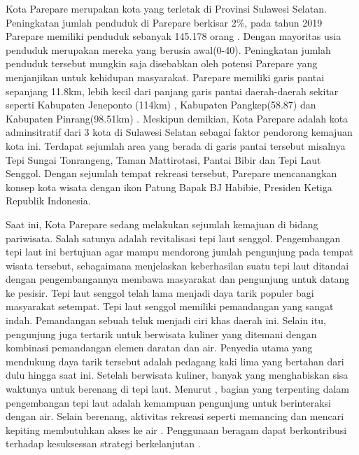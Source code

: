 \documentclass[../projects/thesis.tex]{subfiles}
\begin{document}
Kota Parepare merupakan kota yang terletak di Provinsi Sulawesi Selatan. Peningkatan jumlah penduduk di Parepare berkisar 2\%, pada tahun 2019 Parepare memiliki penduduk sebanyak 145.178 orang \citep{bpskotaparepare2020}. Dengan mayoritas usia penduduk  merupakan mereka yang berusia awal(0-40). Peningkatan jumlah penduduk tersebut mungkin saja disebabkan oleh potensi Parepare yang menjanjikan untuk kehidupan masyarakat.
Parepare memiliki garis pantai sepanjang 11.8km, lebih kecil dari panjang garis pantai daerah-daerah sekitar seperti Kabupaten Jeneponto (114km) \citep{wardasusaniati2011}, Kabupaten Pangkep(58.87) dan Kabupaten Pinrang(98.51km) \citep{goni2018}. Meskipun demikian, Kota Parepare adalah kota adminsitratif dari 3 kota di Sulawesi Selatan \citep{junaid2016} sebagai faktor pendorong kemajuan kota ini.
Terdapat sejumlah area yang berada di garis pantai tersebut misalnya Tepi Sungai Tonrangeng, Taman Mattirotasi, Pantai Bibir dan Tepi Laut Senggol.
Dengan sejumlah tempat rekreasi tersebut, Parepare mencanangkan konsep kota wisata dengan ikon Patung Bapak BJ Habibie, Presiden Ketiga Republik Indonesia.

Saat ini, Kota Parepare sedang melakukan sejumlah kemajuan di bidang pariwisata. Salah satunya adalah revitalisasi tepi laut senggol.
Pengembangan tepi laut ini bertujuan agar mampu mendorong jumlah pengunjung pada tempat wisata tersebut, sebagaimana \cite{hoyle2001} menjelaskan keberhasilan suatu tepi laut ditandai dengan pengembangannya membawa masyarakat dan pengunjung untuk datang ke pesisir.
Tepi laut senggol telah lama menjadi daya tarik populer bagi masyarakat setempat. Tepi laut senggol memiliki pemandangan yang sangat indah. Pemandangan sebuah teluk menjadi ciri khas daerah ini. Selain itu, pengunjung juga tertarik untuk berwisata kuliner yang ditemani dengan kombinasi pemandangan elemen daratan dan air. Penyedia utama yang mendukung daya tarik tersebut adalah pedagang kaki lima yang bertahan dari dulu hingga saat ini. Setelah berwisata kuliner, banyak yang menghabiskan sisa waktunya untuk berenang di tepi laut. Menurut \cite{davidowich1998}, bagian yang terpenting dalam pengembangan tepi laut adalah kemampuan pengunjung untuk berinteraksi dengan air. Selain berenang, aktivitas rekreasi seperti memancing dan mencari kepiting membutuhkan akses ke air \citep{gordon1996}. Penggunaan beragam dapat berkontribusi terhadap kesuksessan strategi berkelanjutan \citep{eldeeb2015}.
\end{document}
